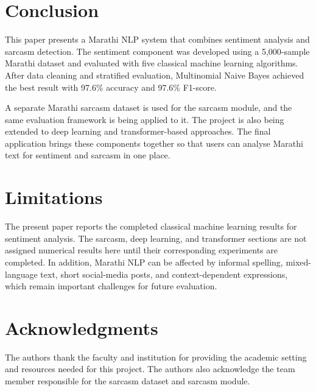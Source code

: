 \documentclass[11pt]{article}
\begin{document}
\section{Conclusion}
This paper presents a Marathi NLP system that combines sentiment analysis and sarcasm detection. The sentiment component was developed using a 5,000-sample Marathi dataset and evaluated with five classical machine learning algorithms. After data cleaning and stratified evaluation, Multinomial Naive Bayes achieved the best result with 97.6\% accuracy and 97.6\% F1-score.

A separate Marathi sarcasm dataset is used for the sarcasm module, and the same evaluation framework is being applied to it. The project is also being extended to deep learning and transformer-based approaches. The final application brings these components together so that users can analyse Marathi text for sentiment and sarcasm in one place.

\section*{Limitations}
The present paper reports the completed classical machine learning results for sentiment analysis. The sarcasm, deep learning, and transformer sections are not assigned numerical results here until their corresponding experiments are completed. In addition, Marathi NLP can be affected by informal spelling, mixed-language text, short social-media posts, and context-dependent expressions, which remain important challenges for future evaluation.

\section*{Acknowledgments}
The authors thank the faculty and institution for providing the academic setting and resources needed for this project. The authors also acknowledge the team member responsible for the sarcasm dataset and sarcasm module.
\end{document}
